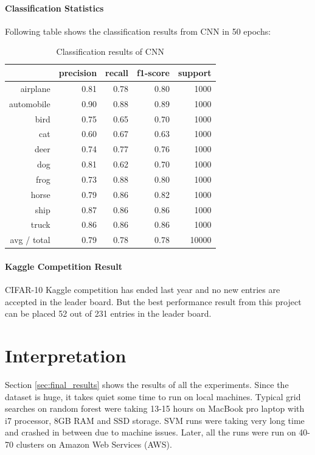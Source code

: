 \documentclass[12pt]{article}
\begin{document}
\paragraph{Classification Statistics}
Following table shows the classification results from CNN in 50 epochs: \\
\begin{table}[H]
\centering
\begin{tabular}{| r | r | r | r | r |}
\hline
    & precision &   recall & f1-score &  support\\
\hline
   airplane   &    0.81 &     0.78   &   0.80&      1000\\
 automobile&       0.90  &    0.88 &     0.89   &   1000\\
       bird     &  0.75   &   0.65  &    0.70    &  1000\\
        cat     &  0.60   &   0.67    &  0.63   &   1000\\
       deer    &   0.74   &   0.77   &   0.76   &   1000\\
        dog     &  0.81   &   0.62    &  0.70   &   1000\\
       frog    &   0.73   &   0.88   &   0.80    &  1000\\
      horse  &     0.79   &   0.86  &    0.82  &    1000\\
       ship    &   0.87    &  0.86   &   0.86   &   1000\\
      truck    &   0.86    &  0.86   &   0.86   &   1000\\
\hline
avg / total   &    0.79   &   0.78  &    0.78   &  10000\\
\hline
\end{tabular}
\caption{Classification results of CNN}
\label{tab:cnn_cs}
\end{table}

\paragraph{Kaggle Competition Result}
CIFAR-10 Kaggle competition has ended last year and no new entries are accepted in the leader board. But the best performance result from this project can be placed 52 out of 231 entries in the leader board.




\section{Interpretation}
Section \ref{sec:final_results} shows the results of all the experiments. Since the dataset is huge, it takes quiet some time to run on local machines. Typical grid searches on random forest were taking 13-15 hours on MacBook pro laptop with i7 processor, 8GB RAM and SSD storage. SVM runs were taking very long time and crashed in between due to machine issues. Later, all the runs were run on 40-70 clusters on Amazon Web Services (AWS). 
\end{document}
